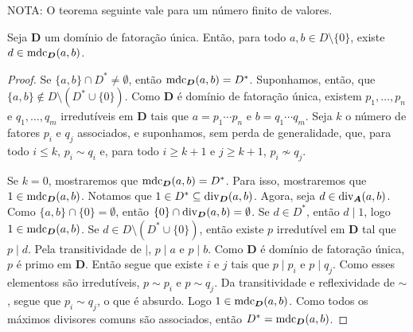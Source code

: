 	NOTA: O teorema seguinte vale para um número finito de valores.
\begin{teo}
	Seja $\bm D$ um domínio de fatoração única. Então, para todo $a,b \in D \setminus \{0\}$, existe $d \in \operatorname{mdc}_{\bm D}(a,b)$.
\end{teo}
\begin{proof}
	Se $\{a,b\} \cap D^* \neq \emptyset$, então $\operatorname{mdc}_{\bm D}(a,b) = D^*$. Suponhamos, então, que $\{a,b\} \notin D \setminus (D^* \cup \{0\})$. Como $\bm D$ é domínio de fatoração única, existem $p_1,\ldots,p_n$ e $q_1,\ldots,q_m$ irredutíveis em $\bm D$ tais que $a = p_1 \cdots p_n$ e $b = q_1 \cdots q_m$. Seja $k$ o número de fatores $p_i$ e $q_j$ associados, e suponhamos, sem perda de generalidade, que, para todo $i \leq k$, $p_i \sim q_i$ e, para todo $i \geq k+1$ e $j\geq k+1$, $p_i \not\sim q_j$.

	Se $k=0$, mostraremos que $\operatorname{mdc}_{\bm D}(a,b) = D^*$. Para isso, mostraremos que $1 \in \operatorname{mdc}_{\bm D}(a,b)$. Notamos que $1 \in D^* \subseteq \operatorname{div}_{\bm D}(a,b)$. Agora, seja $d \in \operatorname{div}_{\bm A}(a,b)$. Como $\{a,b\} \cap \{0\} = \emptyset$, então $\{0\} \cap \operatorname{div}_{\bm D}(a,b) = \emptyset$. Se $d \in D^*$, então $d \mid 1$, logo $1 \in \operatorname{mdc}_{\bm D}(a,b)$. Se $d \in D \setminus (D^* \cup \{0\})$, então existe $p$ irredutível em $\bm D$ tal que $p \mid d$. Pela transitividade de $\mid$, $p \mid a$ e $p \mid b$. Como $\bm D$ é domínio de fatoração única, $p$ é primo em $\bm D$. Então segue que existe $i$ e $j$ tais que $p \mid p_i$ e $p \mid q_j$. Como esses elementoss são irredutíveis, $p \sim p_i$ e $p \sim q_j$. Da transitividade e reflexividade de $\sim$, segue que $p_i \sim q_j$, o que é absurdo. Logo $1 \in \operatorname{mdc}_{\bm D}(a,b)$. Como todos os máximos divisores comuns são associados, então $D^* = \operatorname{mdc}_{\bm D}(a,b)$.


\end{proof}
